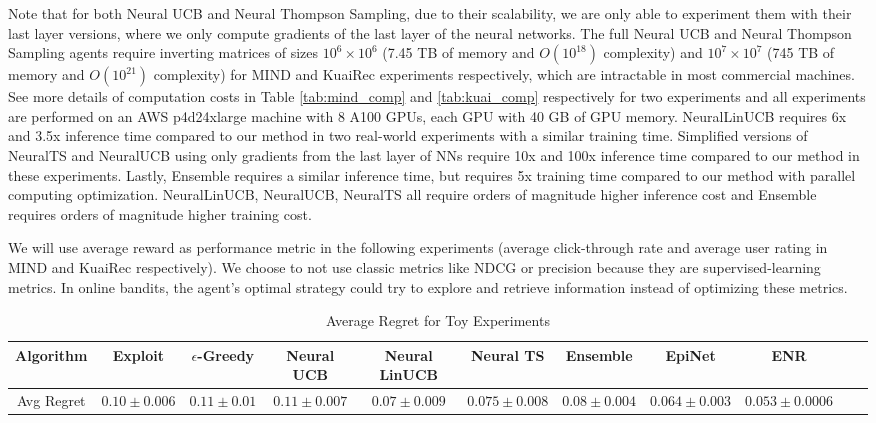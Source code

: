 Note that for both Neural UCB and Neural Thompson Sampling, due to their scalability, we are only able to experiment them with their last layer versions, where we only compute gradients of the last layer of the neural networks. The full Neural UCB and Neural Thompson Sampling agents require inverting matrices of sizes $10^6 \times 10^6$ (7.45 TB of memory and $O(10^{18})$ complexity) and $10^7 \times 10^7$ (745 TB of memory and $O(10^{21})$ complexity) for MIND and KuaiRec experiments respectively, which are intractable in most commercial machines. See more details of computation costs in Table \ref{tab:mind_comp} and \ref{tab:kuai_comp} respectively for two experiments and all experiments are performed on an AWS p4d24xlarge machine with 8 A100 GPUs, each GPU with 40 GB of GPU memory. NeuralLinUCB requires 6x and 3.5x inference time compared to our method in two real-world experiments with a similar training time.  Simplified versions of NeuralTS and NeuralUCB using only gradients from the last layer of NNs require 10x and 100x inference time compared to our method in these experiments. Lastly, Ensemble requires a similar inference time, but requires 5x training time compared to our method with parallel computing optimization. NeuralLinUCB, NeuralUCB, NeuralTS all require orders of magnitude higher inference cost and Ensemble requires orders of magnitude higher training cost.

We will use average reward as performance metric in the following experiments (average click-through rate and average user rating in MIND and KuaiRec respectively). We choose to not use classic metrics like NDCG or precision because they are supervised-learning metrics. In online bandits, the agent’s optimal strategy could try to explore and retrieve information instead of optimizing these metrics.  

\begin{table}[t!]
\small
  \caption{Average Regret for Toy Experiments}
  \vspace{-0.1in}
  \label{tab:toy_regret}
  \begin{tabular}{ccccccccccc}
    \toprule
    Algorithm & Exploit & $\epsilon$-Greedy & Neural UCB & Neural LinUCB & Neural TS & Ensemble & EpiNet & ENR\\
    \midrule 
    Avg Regret & $0.10 \pm 0.006$ & $0.11 \pm 0.01$ & $0.11 \pm 0.007$ & $0.07 \pm 0.009$ & $0.075 \pm 0.008$ & $0.08 \pm 0.004$ & $0.064 \pm 0.003$ & $\mathbf{0.053 \pm 0.0006}$\\
  \bottomrule
\end{tabular}
\vspace{-0.1in}
\end{table}

